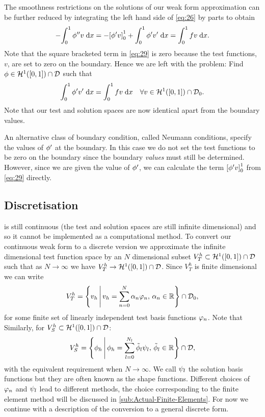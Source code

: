 The smoothness restrictions on the solutions of our weak form approximation can be further reduced by integrating the left hand side of \cref{eq:26} by parts to obtain
\begin{equation}
  -{\int_0^1  \phi''v  {\; \mathrm{{d}}}{x}} = -{\left[ \phi' v \right]}_{0}^{1} + {\int_0^1  \phi'v'  {\; \mathrm{{d}}}{x}} = {\int_0^1 f v {\; \mathrm{{d}}}{x}}.
  \label{eq:29}
\end{equation}
Note that the square bracketed term in \cref{eq:29} is zero because the test functions, $v$, are set to zero on the boundary.
Hence we are left with the problem: Find $\phi \in \mathcal{H}^1([0,1]) \cap \mathcal{D}$ such that
\begin{equation}
  {\int_0^1  \phi'v'  {\; \mathrm{{d}}}{x}} = {\int_0^1  fv  {\; \mathrm{{d}}}{x}} \quad \forall v \in \mathcal{H}^1([0,1]) \cap \mathcal{D}_0.
  \label{eq:symmetric-weak-poisson}
\end{equation}
Note that our test and solution spaces are now identical apart from the boundary values.

An alternative class of boundary condition, called Neumann conditions, specify the values of $\phi'$ at the boundary.
In this case we do not set the test functions to be zero on the boundary since the boundary \emph{values} must still be determined.
However, since we are given the value of $\phi'$, we can calculate the term ${\left[ \phi' v \right]}_{0}^{1}$ from \cref{eq:29} directly.

\subsection{Discretisation}

 is still continuous (\ie the test and solution spaces are still infinite dimensional) and so it cannot be implemented as a computational method.
To convert our continuous weak form to a discrete version we approximate the infinite dimensional test function space by an $N$ dimensional subset $V_{T}^{h} \subset \mathcal{H}^1([0,1]) \cap \mathcal{D}$ such that as $N \rightarrow \infty$ we have $V_{T}^{h} \rightarrow \mathcal{H}^1([0,1]) \cap \mathcal{D}$.
Since $V_{T}^{h}$ is finite dimensional we can write
\begin{equation}
  V_{T}^{h} = \left\{ {{v}_h } \,\middle|\, { {v}_h = \sum_{n=0}^{N}\alpha_{n} \varphi_{n},\, \alpha_{n} \in \mathbb{R}} \right\} \cap \mathcal{D}_0,
  \label{eq:30}
\end{equation}
for some finite set of linearly independent test basis functions $\varphi_{n}$.
Note that
Similarly, for $V_S^h \subset \mathcal{H}^1([0,1]) \cap \mathcal{D}$:
\begin{equation}
  \label{eq:34}
  V_{S}^{h} = \left\{ {{\phi}_h } \,\middle|\, { {\phi}_h = \sum_{l=0}^{N_l}\tilde{\phi}_l \psi_l,\, \tilde{\phi}_l \in \mathbb{R}} \right\}
  \cap \mathcal{D},
\end{equation}
with the equivalent requirement when $N \rightarrow \infty$.
We call $\psi_l$ the solution basis functions but they are often known as the shape functions.
Different choices of $\varphi_{n}$ and $\psi_l$ lead to different methods, the choice corresponding to the finite element method will be discussed in \cref{sub:Actual-Finite-Elements}.
For now we continue with a description of the conversion to a general discrete form.


